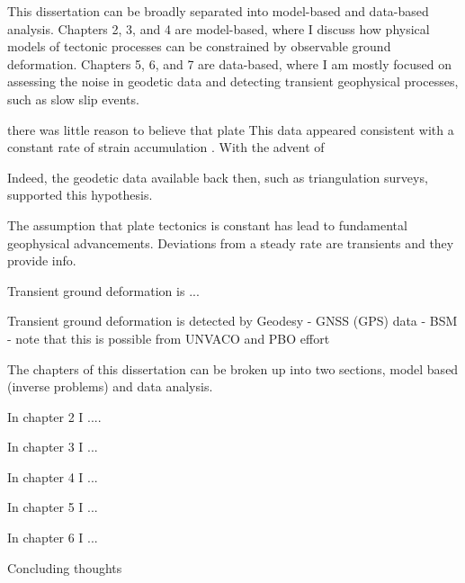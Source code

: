 This dissertation can be broadly separated into model-based and data-based analysis. Chapters 2, 3, and 4 are model-based, where I discuss how physical models of tectonic processes can be constrained by observable ground deformation. Chapters 5, 6, and 7 are data-based, where I am mostly focused on assessing the noise in geodetic data and detecting transient geophysical processes, such as slow slip events.    




 there was little reason to believe that plate This data appeared consistent with a constant rate of strain accumulation \citep[e.g.,][]{Savage1973}. With the advent of         

Indeed, the geodetic data available back then, such as triangulation surveys, supported this hypothesis.


The assumption that plate tectonics is constant has lead to fundamental geophysical advancements. Deviations from a steady rate are transients and they provide info.

Transient ground deformation is ...

Transient ground deformation is detected by
Geodesy
 - GNSS (GPS) data
 - BSM
 - note that this is possible from UNVACO and PBO effort
 

The chapters of this dissertation can be broken up into two sections, model based (inverse problems) and data analysis.

In chapter 2 I ....

In chapter 3 I ...

In chapter 4 I ...

In chapter 5 I ...

In chapter 6 I ...

Concluding thoughts


